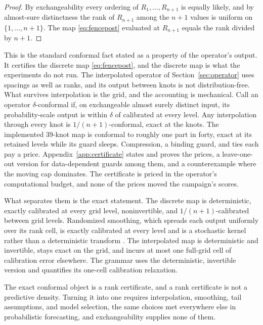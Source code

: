 \documentclass[11pt]{article}
\theoremstyle{remark}
\begin{document}
\begin{proof}
By exchangeability every ordering of $R_1, \dots, R_{n+1}$ is equally likely, and by
almost-sure distinctness the rank of $R_{n+1}$ among the $n+1$ values is uniform on
$\{1, \dots, n+1\}$. The map \eqref{eq:fencepost} evaluated at $R_{n+1}$ equals the rank
divided by $n+1$.
\end{proof}

This is the standard conformal fact \citep{vovk2005algorithmic} stated as a property of the
operator's output. It certifies the discrete map \eqref{eq:fencepost}, and the discrete
map is what the experiments do not run. The interpolated operator of
Section~\ref{sec:operator} uses spacings as well as ranks, and its output between knots
is not distribution-free. What survives interpolation is the grid, and the
accounting is mechanical. Call an operator $\delta$-conformal if, on exchangeable
almost surely distinct input, its probability-scale output is within $\delta$ of
calibrated at every level. Any interpolation through every knot is
$1/(n+1)$-conformal, exact at the knots. The implemented $39$-knot map is conformal
to roughly one part in forty, exact at its retained levels while its guard sleeps.
Compression, a binding guard, and ties each pay a price.
Appendix~\ref{app:certificate} states and proves the prices, a leave-one-out
version for data-dependent guards among them, and a counterexample where the moving
cap dominates. The certificate is priced in the operator's computational budget, and
none of the prices moved the campaign's scores.

What separates them is the exact statement. The discrete map is deterministic,
exactly calibrated at every grid level, noninvertible, and $1/(n+1)$-calibrated between
grid levels. Randomized smoothing, which spreads each output uniformly over its rank
cell, is exactly calibrated at every level and is a stochastic kernel rather than a
deterministic transform \citep{vovk2005algorithmic}. The interpolated map is
deterministic and invertible, stays exact on the grid, and incurs at most one full-grid
cell of calibration error elsewhere. The grammar uses the deterministic, invertible version and quantifies its one-cell calibration relaxation.

The exact conformal object is a rank certificate, and a rank certificate is not a
predictive density. Turning it into one requires interpolation, smoothing, tail
assumptions, and model selection, the same choices met everywhere else in probabilistic
forecasting, and exchangeability supplies none of them.
\end{document}
